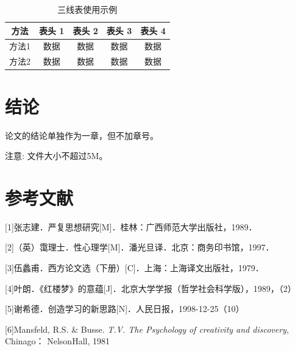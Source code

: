 \documentclass[zihao=-4]{ctexart}
\begin{document}
\begin{spacing}{1.5}
\begin{table}[H]
\begin{tabular}{|l||c|c|c|c|c|c|}
\end{tabular}
\end{table}


\begin{table}[H]
\caption{三线表使用示例}
\centering
\begin{tabular}{ccccc}
\hline  
\textbf{方法} & \textbf{表头 1} & \textbf{表头 2} & \textbf{表头 3} & \textbf{表头 4} \\ 
\hline  
方法1 & 数据  & 数据  & 数据  & 数据\\
方法2 & 数据  & 数据  & 数据  & 数据\\
\hline
\end{tabular} 
\end{table} 

\section*{结论}%
论文的结论单独作为一章，但不加章号。

注意: 文件大小不超过5M。

\end{spacing}

\newpage

\section*{参考文献} %
[1]张志建．严复思想研究[M]．桂林：广西师范大学出版社，1989． 

[2]（英）霭理士．性心理学[M]．潘光旦译．北京：商务印书馆，1997．


[3]伍蠡甫．西方论文选（下册）[C]．上海：上海译文出版社，1979．

[4]叶朗．《红楼梦》的意蕴[J]．北京大学学报（哲学社会科学版），1989，（2）

[5]谢希德．创造学习的新思路[N]．人民日报，1998-12-25（10）

[6]Mansfeld, R.S. \& Busse. \textit{T.V. The Psychology of creativity and discovery}, Chinago：
NelsonHall, 1981




% 



\end{document}
